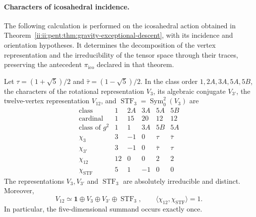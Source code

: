 \paragraph{Characters of icosahedral incidence.}
The following calculation is performed on the icosahedral action obtained in
Theorem~\ref{ii:ii:pent:thm:gravity-exceptional-descent}, with its incidence
and orientation hypotheses. It determines the decomposition of the
vertex representation and the irreducibility of the tensor space
through their traces, preserving the antecedent
\(\pi_{\mathrm{ico}}\) declared in that theorem.

\begin{proposition}
\label{ii:prop:ii-pent-caracteres}
Let \(\tau=(1+\sqrt5)/2\) and
\(\bar\tau=(1-\sqrt5)/2\). In the class order
\(1,2A,3A,5A,5B\), the characters of the rotational representation
\(V_3\), its algebraic conjugate \(V_{3'}\), the twelve-vertex
representation \(V_{12}\), and
\(\operatorname{STF}_3=\operatorname{Sym}^2_0(V_3)\) are
\begin{equation}
\label{ii:eq:ii-pent-tabla-caracteres}
\begin{array}{c|rrrrr}
\text{class} &1&2A&3A&5A&5B\\ \hline
\text{cardinal}&1&15&20&12&12\\
\text{class of }g^2&1&1&3A&5B&5A\\ \hline
\chi_3&3&-1&0&\tau&\bar\tau\\
\chi_{3'}&3&-1&0&\bar\tau&\tau\\
\chi_{12}&12&0&0&2&2\\
\chi_{\mathrm{STF}}&5&1&-1&0&0
\end{array}
\end{equation}
The representations \(V_3,V_{3'}\) and
\(\operatorname{STF}_3\) are absolutely irreducible and distinct.
Moreover,
\begin{equation}
\label{ii:eq:ii-pent-descomposicion-demostrada}
 V_{12}\simeq\mathbf1\oplus V_3\oplus V_{3'}
                  \oplus\operatorname{STF}_3,
 \qquad
 \langle\chi_{12},\chi_{\mathrm{STF}}\rangle=1.
\end{equation}
In particular, the five-dimensional summand occurs exactly once.
\end{proposition}

